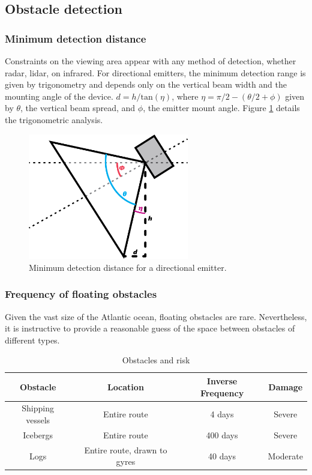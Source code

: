 \appendix
\renewcommand{\thesubsection}{\Alph{subsection}}
\renewcommand{\thesubsubsection}{\thesubsection.\arabic{subsubsection}}
\subsection{\label{app:AppendixA}Obstacle detection} 

\subsubsection{\label{app:minimum-detection-distance}Minimum detection distance}
Constraints on the viewing area appear with any method of detection, whether radar, lidar, on infrared. For directional emitters, the minimum detection range is given by trigonometry and depends only on the vertical beam width and the mounting angle of the device. $d = h/\text{tan}(\eta)$, where $\eta=\pi/2-(\theta/2+\phi)$ given by $\theta$, the vertical beam spread, and $\phi$, the emitter mount angle. Figure \ref{fig:emitter-angle} details the trigonometric analysis.
\begin{figure}
\includegraphics[width=70mm,natwidth=505,natheight=394]{"./image/directional-emitters"}
\caption[Minimum distance to detected obstacle.]{\label{fig:emitter-angle}Minimum detection distance for a directional emitter.}
\end{figure}


\subsubsection{\label{app:obstacle-frequency}Frequency of floating obstacles}
Given the vast size of the Atlantic ocean, floating obstacles are rare. Nevertheless, it is instructive to provide a reasonable guess of the space between obstacles of different types.

\begin{table}
\caption{\label{tab:obstacles}Obstacles and risk}
\begin{tabular}{c|c|c|c}

Obstacle & Location & Inverse Frequency & Damage\\[0.6cm]
\hline

Shipping vessels & Entire route & 4 days & Severe \\
Icebergs & Entire route & 400 days & Severe \\
Logs & Entire route, drawn to gyres & 40 days & Moderate \\

\end{tabular}
\end{table}

